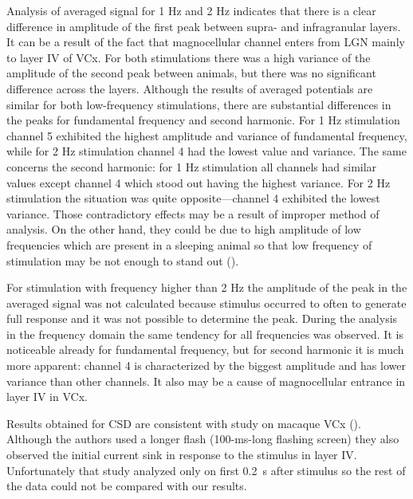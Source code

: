 \documentclass{pracalicmgr}
\begin{document}
    Analysis of averaged signal for 1 Hz and 2 Hz indicates that there is a clear difference in amplitude of the first peak between supra- and infragranular layers. It can be a result of the fact that magnocellular channel enters from LGN mainly to layer IV of VCx. For both stimulations there was a high variance of the amplitude of the second peak between animals, but there was no significant difference across the layers. Although the results of averaged potentials are similar for both low-frequency stimulations, there are substantial differences in the peaks for fundamental frequency and second harmonic. For 1 Hz stimulation channel 5 exhibited the highest amplitude and variance of fundamental frequency, while for 2 Hz stimulation channel 4 had the lowest value and variance. The same concerns the second harmonic: for 1 Hz stimulation all channels had similar values except channel 4 which stood out having the highest variance. For 2 Hz stimulation the situation was quite opposite---channel 4 exhibited the lowest variance. Those contradictory effects may be a result of improper method of analysis. On the other hand, they could be due to high amplitude of low frequencies which are present in a sleeping animal so that low frequency of stimulation may be not enough to stand out (\cite{ja}).
    
    For stimulation with frequency higher than 2 Hz the amplitude of the peak in the averaged signal was not calculated because stimulus occurred to often to generate full response and it was not possible to determine the peak. During the analysis in the frequency domain the same tendency for all frequencies was observed. It is noticeable already for fundamental frequency, but for second harmonic it is much more apparent: channel 4 is characterized by the biggest amplitude and has lower variance than other channels. It also may be a cause of magnocellular entrance in layer IV in VCx.
    
    Results obtained for CSD are consistent with study on macaque VCx (\cite{maier2011}). Although the authors used a longer flash (100-ms-long flashing screen) they also observed the initial current sink in response to the stimulus in layer IV. Unfortunately that study analyzed only on first 0.2~s after stimulus so the rest of the data could not be compared with our results. 
    

\printbibliography[heading=bibintoc]
\end{document}
